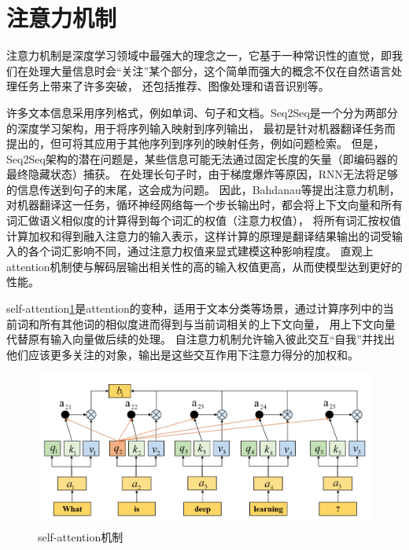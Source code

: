 

\section{注意力机制}
注意力机制是深度学习领域中最强大的理念之一，它基于一种常识性的直觉，即我们在处理大量信息时会“关注”某个部分，这个简单而强大的概念不仅在自然语言处理任务上带来了许多突破，
还包括推荐、图像处理和语音识别等。

许多文本信息采用序列格式，例如单词、句子和文档。Seq2Seq是一个分为两部分的深度学习架构，用于将序列输入映射到序列输出，
最初是针对机器翻译任务而提出的，但可将其应用于其他序列到序列的映射任务，例如问题检索。
但是，Seq2Seq架构的潜在问题是，某些信息可能无法通过固定长度的矢量（即编码器的最终隐藏状态）捕获。
在处理长句子时，由于梯度爆炸等原因，RNN无法将足够的信息传送到句子的末尾，这会成为问题。
因此，Bahdanau等\cite{bahdanau2014neural}提出注意力机制，对机器翻译这一任务，循环神经网络每一个步长输出时，都会将上下文向量和所有词汇做语义相似度的计算得到每个词汇的权值（注意力权值），
将所有词汇按权值计算加权和得到融入注意力的输入表示，这样计算的原理是翻译结果输出的词受输入的各个词汇影响不同，通过注意力权值来显式建模这种影响程度。
直观上attention机制使与解码层输出相关性的高的输入权值更高，从而使模型达到更好的性能。

self-attention\ref{fig:attent}是attention的变种，适用于文本分类等场景，通过计算序列中的当前词和所有其他词的相似度进而得到与当前词相关的上下文向量，
用上下文向量代替原有输入向量做后续的处理。
自注意力机制允许输入彼此交互“自我”并找出他们应该更多关注的对象，输出是这些交互作用下注意力得分的加权和。
\begin{figure}[htbp]
  \centering
  \includegraphics[width=13cm]{./images/attention.png}
  \caption{self-attention机制\cite{li2020survey}}
  \label{fig:attent}
\end{figure}

